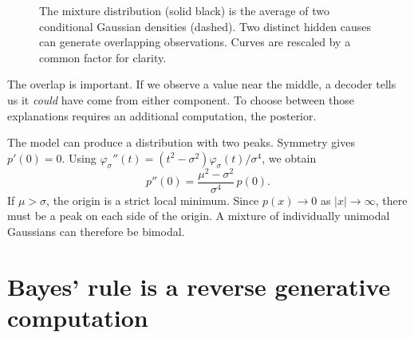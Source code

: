 \begin{figure}[H]
\centering
{}
\caption{The mixture distribution (solid black) is the average of two conditional Gaussian densities (dashed). Two distinct hidden causes can generate overlapping observations. Curves are rescaled by a common factor for clarity.}
\end{figure}

The overlap is important. If we observe a value near the middle, a decoder tells us it \emph{could} have come from either component. To choose between those explanations requires an additional computation, the posterior.

The model can produce a distribution with two peaks. Symmetry gives \(p'(0)=0\). Using
\(\varphi_\sigma''(t)=(t^2-\sigma^2)\varphi_\sigma(t)/\sigma^4\), we obtain
\[
 p''(0)=\frac{\mu^2-\sigma^2}{\sigma^4}\,p(0).
\]
If \(\mu>\sigma\), the origin is a strict local minimum. Since \(p(x)\to0\) as \(|x|\to\infty\), there must be a peak on each side of the origin. A mixture of individually unimodal Gaussians can therefore be bimodal.

\section{Bayes' rule is a reverse generative computation}

